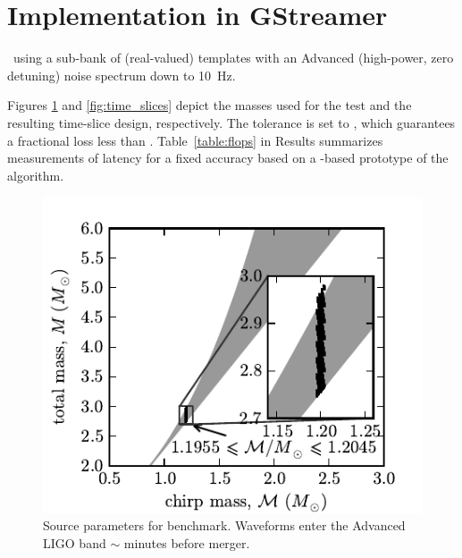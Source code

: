 \documentclass[portrait,plainboxedsections]{sciposter}
\begin{document}
\begin{minipage}[t]{0.25\textwidth}

\section*{Implementation in GStreamer}

\lloid\ using a sub-bank of  (real-valued) templates with an Advanced \LIGO{}
(high-power, zero detuning) noise spectrum down to 10~Hz.

{\setlength{\parindent}{1em}
Figures \ref{fig:tmpltbank} and \ref{fig:time_slices} depict the masses used for the
test and the resulting time-slice design, respectively. The \SVD{} tolerance is
set to , which guarantees a fractional \SNR{} loss less than .
Table~\ref{table:flops} in Results summarizes measurements of latency for a
fixed accuracy based on a \gstreamer{}-based prototype of the \lloid{}
algorithm.
}

\begin{figure}[h]
	\includegraphics[width=1.1\textwidth]{figures/tmpltbank}
	\caption{\label{fig:tmpltbank}Source parameters for benchmark. Waveforms enter the Advanced {\small LIGO} band $\sim$ minutes before merger.}
\end{figure}


\end{minipage}
\end{document}
